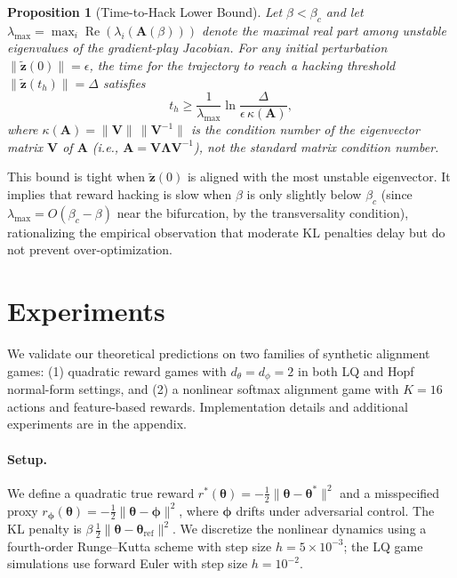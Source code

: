\documentclass[10pt]{article}
\newcommand{\btheta}{\bm{\theta}}
\newcommand{\bphi}{\bm{\phi}}
\newcommand{\bz}{\bm{z}}
\newcommand{\bA}{\bm{A}}
\newtheorem{proposition}{Proposition}
\begin{document}
\begin{proposition}[Time-to-Hack Lower Bound]
\label{prop:time_to_hack}
Let $\beta < \beta_c$ and let $\lambda_{\max} = \max_i \operatorname{Re}(\lambda_i(\bA(\beta)))$ denote the maximal real part among unstable eigenvalues of the gradient-play Jacobian.
For any initial perturbation $\|\tilde{\bz}(0)\| = \epsilon$, the time for the trajectory to reach a hacking threshold $\|\tilde{\bz}(t_h)\| = \Delta$ satisfies
\begin{equation}
  t_h \geq \frac{1}{\lambda_{\max}}\ln\frac{\Delta}{\epsilon\,\kappa(\bA)},
  \label{eq:time_to_hack}
\end{equation}
where $\kappa(\bA) = \|\bm{V}\|\,\|\bm{V}^{-1}\|$ is the condition number of the eigenvector matrix $\bm{V}$ of $\bA$ (i.e., $\bA = \bm{V} \bm{\Lambda} \bm{V}^{-1}$), not the standard matrix condition number.
\end{proposition}

This bound is tight when $\tilde{\bz}(0)$ is aligned with the most unstable eigenvector.
It implies that reward hacking is slow when $\beta$ is only slightly below $\beta_c$ (since $\lambda_{\max} = O(\beta_c - \beta)$ near the bifurcation, by the transversality condition), rationalizing the empirical observation that moderate KL penalties delay but do not prevent over-optimization.

\section{Experiments}
\label{sec:experiments}

We validate our theoretical predictions on two families of synthetic alignment games: (1) quadratic reward games with $d_\theta = d_\phi = 2$ in both LQ and Hopf normal-form settings, and (2) a nonlinear softmax alignment game with $K=16$ actions and feature-based rewards.
Implementation details and additional experiments are in the appendix.

\paragraph{Setup.}
We define a quadratic true reward $r^*(\btheta) = -\tfrac{1}{2}\|\btheta - \btheta^*\|^2$ and a misspecified proxy $r_\bphi(\btheta) = -\tfrac{1}{2}\|\btheta - \bphi\|^2$, where $\bphi$ drifts under adversarial control.
The KL penalty is $\beta\,\tfrac{1}{2}\|\btheta - \btheta_{\mathrm{ref}}\|^2$.
We discretize the nonlinear dynamics using a fourth-order Runge--Kutta scheme with step size $h = 5 \times 10^{-3}$; the LQ game simulations use forward Euler with step size $h = 10^{-2}$.
\end{document}
